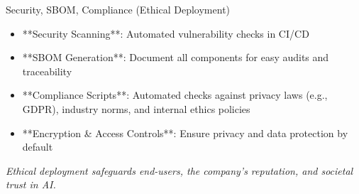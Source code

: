 \documentclass[aspectratio=169]{beamer}
\begin{document}
%
%
%
%
\begin{frame}{Security, SBOM, Compliance (Ethical Deployment)}
\begin{itemize}
\item **Security Scanning**: Automated vulnerability checks in CI/CD
\item **SBOM Generation**: Document all components for easy audits and traceability
\item **Compliance Scripts**: Automated checks against privacy laws (e.g., GDPR), industry norms, and internal ethics policies
\item **Encryption \& Access Controls**: Ensure privacy and data protection by default
\end{itemize}

\emph{Ethical deployment safeguards end-users, the company’s reputation, and societal trust in AI.}
\end{frame}
\end{document}
